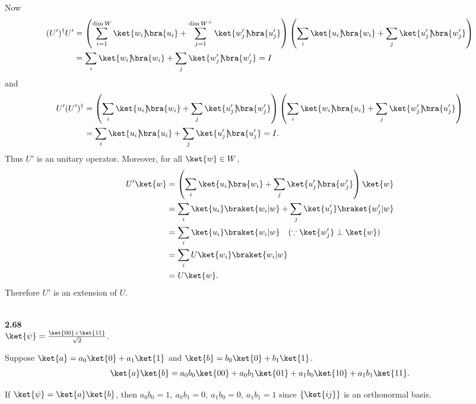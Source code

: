\documentclass[10pt]{book}
\newcommand{\kb}[1]{\ket{#1}\hspace{-1mm} \bra{#1}} %
\newcommand{\kbt}[2]{\ket{#1}\hspace{-1mm} \bra{#2}} %
\newcommand{\Textbf}[1]{\hspace{3mm}\\ \textbf{#1}\\}
\begin{document}
	
	Now
	\begin{equation}
\begin{aligned}
		(U')^\dagger U' &= \left( \sum_{i = 1}^{\dim W} \kbt{w_i}{u_i} + \sum_{j = 1}^{\dim W^\perp} \kbt{w_j'}{u_j'} \right)  \left( \sum_i \kbt{u_i}{w_i} + \sum_j \kbt{u_j'}{w_j'} \right)\\
		&= \sum_i \kb{w_i} + \sum_j \kb{w_j'} = I
	\end{aligned}
\end{equation}
	and
	\begin{equation}
\begin{aligned}
		U' (U')^\dagger &= \left( \sum_i \kbt{u_i}{w_i} + \sum_j \kbt{u_j'}{w_j'} \right) \left( \sum_i \kbt{w_i}{u_i} + \sum_j \kbt{w_j'}{u_j'} \right)\\
		&= \sum_i \kb{u_i} + \sum_j \kb{u_j'} = I.
	\end{aligned}
\end{equation}
	Thus $U'$ is an unitary operator.
	Moreover, for all $\ket{w} \in W$,
	\begin{equation}
\begin{aligned}
		U' \ket{w} &= \left( \sum_i \kbt{u_i}{w_i} + \sum_j \kbt{u_j'}{w_j'} \right) \ket{w}\\
		&= \sum_i \ket{u_i} \braket{w_i | w} + \sum_j \ket{u_j'} \braket{w_j' | w}\\
		&= \sum_i \ket{u_i} \braket{w_i | w}  ~~~(\because \ket{w_j'} \perp \ket{w})\\
		&= \sum_i U \ket{w_i} \braket{w_i | w}\\
		&= U \ket{w}.
	\end{aligned}
\end{equation}
	Therefore $U'$ is an extension of $U$.
	
	
	\Textbf{2.68}
	
	$\ket{\psi} = \frac{\ket{00} + \ket{11}}{\sqrt{2}}$.
	
	Suppose $\ket{a} = a_0 \ket{0}  + a_1\ket{1}$ and $\ket{b} = b_0 \ket{0}  + b_1\ket{1}$.
	\begin{equation}
\begin{aligned}
		\ket{a} \ket{b} = a_0 b_0 \ket{00} + a_0 b_1 \ket{01} + a_1 b_0 \ket{10} + a_1 b_1 \ket{11}.
	\end{aligned}
\end{equation}
	
	If $\ket{\psi} = \ket{a} \ket{b}$, then $a_0 b_0 = 1,~ a_0 b_1=0,~ a_1 b_0 = 0,~ a_1 b_1 = 1$ since $\{\ket{ij}\}$ is an orthonormal basis.
	
\end{document}
